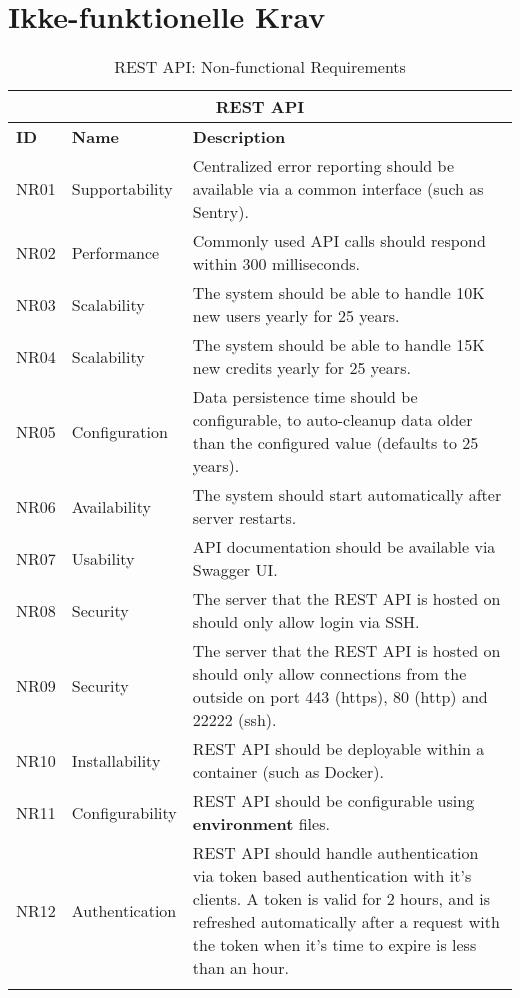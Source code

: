 \section{Ikke-funktionelle Krav} \label{ikke-funktionelle_krav}

\begin{longtable}{|p{1cm}|p{3.5cm}|p{11cm}|} 
    \hline
    \multicolumn{3}{|c|}{\textbf{REST API}}  \\ 
    \hline
    \textbf{ID} & \textbf{Name} & \textbf{Description} \\
    \hline
    NR01 & Supportability &  Centralized error reporting should be available via a common interface (such as Sentry).\\
    \hline
    NR02 & Performance &  Commonly used API calls should respond within 300 milliseconds. \\
    \hline
    NR03 & Scalability &  The system should be able to handle 10K new users yearly for 25 years.\\
    \hline
    NR04 & Scalability &  The system should be able to handle 15K new credits yearly for 25 years.\\
    \hline
    NR05 & Configuration & Data persistence time should be configurable, to auto-cleanup data older than the configured value (defaults to 25 years).\\
    \hline
    NR06 & Availability &  The system should start automatically after server restarts. \\
    \hline
    NR07 & Usability &  API documentation should be available via Swagger UI. \\
    \hline
    NR08 & Security &  The server that the REST API is hosted on should only allow login via SSH. \\
    \hline
    NR09 & Security &  The server that the REST API is hosted on should only allow connections from the outside on port 443 (https), 80 (http) and 22222 (ssh). \\
    \hline
    NR10 & Installability & REST API should be deployable within a container (such as Docker). \\
    \hline
    NR11 & Configurability & REST API should be configurable using \textbf{environment} files. \\
    \hline
    NR12 & Authentication & REST API should handle authentication via token based authentication with it's clients. A token is valid for 2 hours, and is refreshed automatically after a request with the token when it's time to expire is less than an hour. \\ %
    \hline
    \caption{REST API: Non-functional Requirements}
    \label{tab:rest_api_nfunreq}
\end{longtable}


